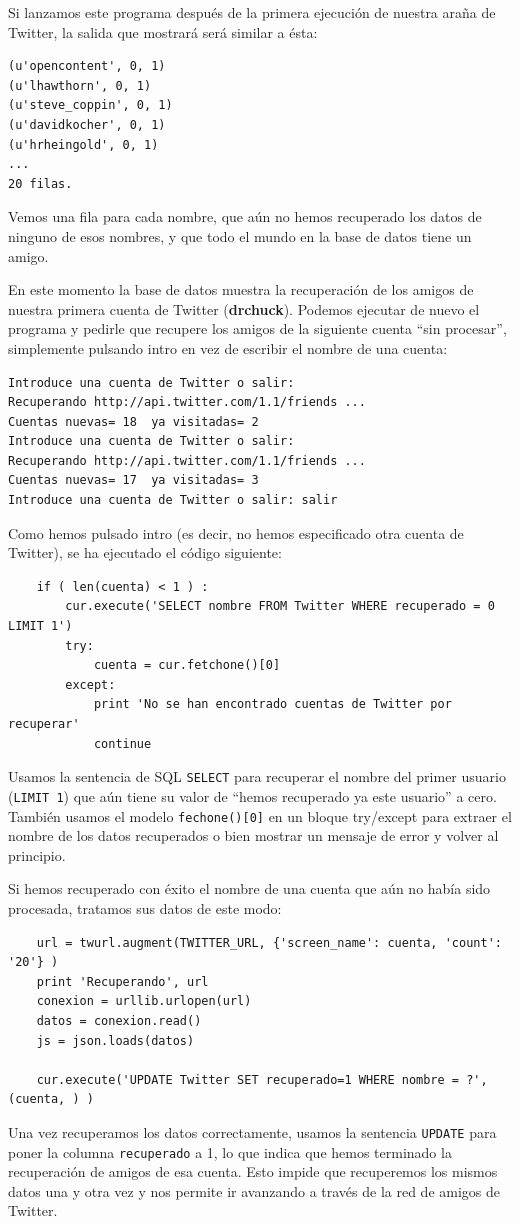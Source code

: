 Si lanzamos este programa después de la primera ejecución de nuestra araña
de Twitter, la salida que mostrará será similar a ésta:

\beforeverb
\begin{verbatim}
(u'opencontent', 0, 1)
(u'lhawthorn', 0, 1)
(u'steve_coppin', 0, 1)
(u'davidkocher', 0, 1)
(u'hrheingold', 0, 1)
...
20 filas.
\end{verbatim}
\afterverb
%
Vemos una fila para cada nombre, que aún no hemos
recuperado los datos de ninguno de esos nombres, y
que todo el mundo en la base de datos tiene un amigo.

En este momento la base de datos muestra la recuperación de los amigos de
nuestra primera cuenta de Twitter ({\bf drchuck}). Podemos ejecutar de nuevo
el programa y pedirle que recupere los amigos de la siguiente
cuenta ``sin procesar'', simplemente pulsando intro en vez de
escribir el nombre de una cuenta:

\beforeverb
\begin{verbatim}
Introduce una cuenta de Twitter o salir:  
Recuperando http://api.twitter.com/1.1/friends ...
Cuentas nuevas= 18  ya visitadas= 2
Introduce una cuenta de Twitter o salir: 
Recuperando http://api.twitter.com/1.1/friends ...
Cuentas nuevas= 17  ya visitadas= 3
Introduce una cuenta de Twitter o salir: salir
\end{verbatim}
\afterverb
%
Como hemos pulsado intro (es decir, no hemos especificado otra cuenta de Twitter),
se ha ejecutado el código siguiente:

\beforeverb
\begin{verbatim}
    if ( len(cuenta) < 1 ) :
        cur.execute('SELECT nombre FROM Twitter WHERE recuperado = 0 LIMIT 1')
        try:
            cuenta = cur.fetchone()[0]
        except:
            print 'No se han encontrado cuentas de Twitter por recuperar'
            continue
\end{verbatim}
\afterverb
%
Usamos la sentencia de SQL {\tt SELECT} para recuperar el nombre del primer
usuario ({\tt LIMIT 1}) que aún tiene su valor de ``hemos recuperado ya este usuario''
a cero. También usamos el modelo {\tt fechone()[0]} en un bloque
try/except para extraer el nombre de los datos recuperados o bien
mostrar un mensaje de error y volver al principio.

Si hemos recuperado con éxito el nombre de una cuenta que aún no había sido procesada,
tratamos sus datos de este modo:

\beforeverb
\begin{verbatim}
    url = twurl.augment(TWITTER_URL, {'screen_name': cuenta, 'count': '20'} )
    print 'Recuperando', url
    conexion = urllib.urlopen(url)
    datos = conexion.read()
    js = json.loads(datos)

    cur.execute('UPDATE Twitter SET recuperado=1 WHERE nombre = ?', (cuenta, ) )
\end{verbatim}
\afterverb
%
Una vez recuperamos los datos correctamente, usamos la sentencia {\tt UPDATE}
para poner la columna {\tt recuperado} a 1, lo que indica que hemos terminado
la recuperación de amigos de esa cuenta. Esto impide que recuperemos los
mismos datos una y otra vez y nos permite ir avanzando a través de la red
de amigos de Twitter. 

